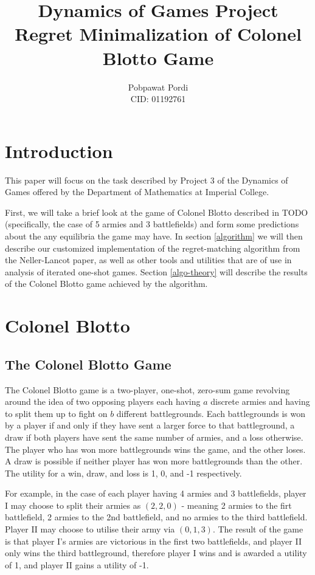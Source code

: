 \documentclass [11pt]{article}
\title{Dynamics of Games Project\\
  Regret Minimalization of Colonel Blotto Game
}
\author{Pobpawat Pordi \\
  CID: 01192761 \\
}
\begin{document}
\maketitle

\pagebreak

\tableofcontents

\pagebreak

\section{Introduction}

This paper will focus on the task described by Project 3 of the Dynamics of Games offered by the Department of Mathematics at Imperial College.

First, we will take a brief look at the game of Colonel Blotto described in TODO (specifically, the case of 5 armies and 3 battlefields) and form some predictions about the any equilibria the game may have. In section \ref{algorithm} we will then describe our customized implementation of the regret-matching algorithm from the Neller-Lancot paper, as well as other tools and utilities that are of use in analysis of iterated one-shot games. Section \ref{algo-theory} will describe the results of the Colonel Blotto game achieved by the algorithm.

\pagebreak

\section{Colonel Blotto} \label{blotto game}

\subsection{The Colonel Blotto Game}

The Colonel Blotto game is a two-player, one-shot, zero-sum game revolving around the idea of two opposing players each having $a$ discrete armies and having to split them up to fight on $b$ different battlegrounds. Each battlegrounds is won by a player if and only if they have sent a larger force to that battleground, a draw if both players have sent the same number of armies, and a loss otherwise. The player who has won more battlegrounds wins the game, and the other loses. A draw is possible if neither player has won more battlegrounds than the other. The utility for a win, draw, and loss is 1, 0, and -1 respectively.

For example, in the case of each player having 4 armies and 3 battlefields, player I may choose to split their armies as $(2, 2, 0)$ - meaning 2 armies to the firt battlefield, 2 armies to the 2nd battlefield, and no armies to the third battlefield. Player II may choose to utilise their army via $(0, 1, 3)$. The result of the game is that player I's armies are victorious in the first two battlefields, and player II only wins the third battleground, therefore player I wins and is awarded a utility of 1, and player II gains a utility of -1.
\end{document}

